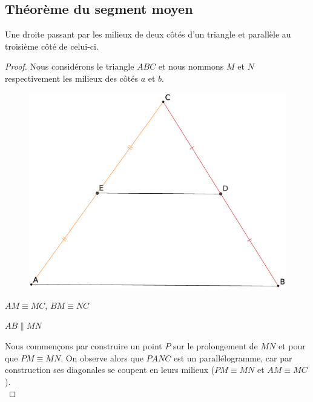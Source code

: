 \documentclass[a4paper,12pt]{article}
\begin{document}
\pagebreak
\subsection{Théorème du segment moyen}
\begin{theorem}
Une droite passant par les milieux de deux côtés d'un triangle et parallèle au troisième côté de celui-ci.
\end{theorem}

\begin{proof}
Nous considérons le triangle $ABC$ et nous nommons $M$ et $N$ respectivement les milieux des côtés $a$ et $b$. 

 \begin{figure}[H]
        \centering
        \includegraphics[scale=0.3]{segmentMoyen1.eps}
    \end{figure}

\begin{hyp}
$AM \equiv MC$, $BM \equiv NC$
\end{hyp}

\begin{concl}
$AB \parallel MN$
\end{concl}

Nous commençons par construire un point $P$ sur le prolongement de $MN$ et pour que $PM \equiv MN$. On observe alors que $PANC$ est un parallélogramme, car par construction ses diagonales se coupent en leurs milieux ($PM \equiv MN$ et $AM \equiv MC$).\\


\end{proof}
\end{document}

